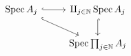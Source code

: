 \[\begin{tikzcd}
	{\operatorname{Spec}A_j} & {\amalg_{j\in\mathbb N}\operatorname{Spec}A_j} \\
	& {\operatorname{Spec}\prod_{j\in \mathbb N}A_j}
	\arrow[hook, from=1-1, to=1-2]
	\arrow[hook, from=1-1, to=2-2]
	\arrow[hook, from=1-2, to=2-2]
\end{tikzcd}\]

